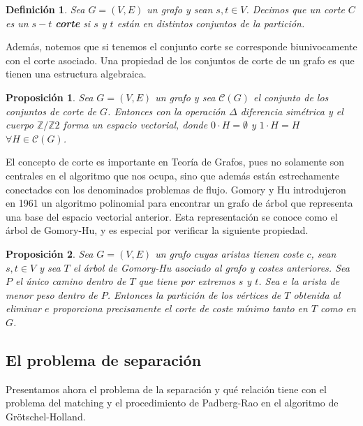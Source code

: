\documentclass[twoside,a4paper,openright,12pt]{book}
\newtheorem{defi}{Definici\'on}[section]
\newtheorem{prop}{Proposici\'on}[section]
\newcommand{\Z}{\mathbb{Z}}
\begin{document}
\begin{defi}
Sea $G=(V,E)$ un grafo y sean $s,t\in V$. Decimos que un corte $C$ es un $s-t$ \textbf{corte} si $s$ y $t$ están en distintos conjuntos de la partición. 
\end{defi}

Además, notemos que si tenemos el conjunto corte se corresponde biunivocamente con el corte asociado. Una propiedad de los conjuntos de corte de un grafo es que tienen una estructura algebraica.



\begin{prop}
Sea $G=(V,E)$ un grafo y sea $\mathcal{C}(G)$ el conjunto de los conjuntos de corte de $G$. Entonces con la operación $\Delta$ diferencia simétrica y el cuerpo $\Z/\Z2$ forma un espacio vectorial, donde $0\cdot H = \emptyset$ y $1\cdot H = H$ $\forall H \in \mathcal{C}(G)$.
\end{prop}

El concepto de corte es importante en Teoría de Grafos, pues no solamente son centrales en el algoritmo que nos ocupa, sino que además están estrechamente conectados con los denominados problemas de flujo.  Gomory y Hu introdujeron en 1961 un algoritmo polinomial para encontrar un grafo de árbol que representa una base del espacio vectorial anterior. Esta representación se conoce como el árbol de Gomory-Hu, y es especial por verificar la siguiente propiedad.

\begin{prop}
Sea $G=(V,E)$ un grafo cuyas aristas tienen coste $c$, sean $s,t\in V$ y sea $T$ el árbol de Gomory-Hu asociado al grafo y costes anteriores. Sea $P$ el único camino dentro de $T$ que tiene por extremos $s$ y $t$. Sea $e$ la arista de menor peso dentro de $P$. Entonces la partición de los vértices de $T$ obtenida al eliminar $e$ proporciona precisamente el corte de coste mínimo tanto en $T$ como en $G$.
\end{prop}
\subsection{El problema de separación}

Presentamos ahora el problema de la separación y qué relación tiene con el problema del matching y el procedimiento de Padberg-Rao en el algoritmo de Grötschel-Holland. 
\end{document}
